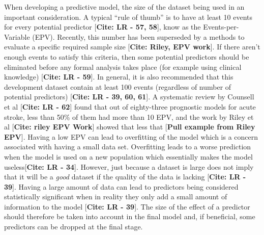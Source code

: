 \documentclass[12pt,PhD,twoside,openright]{muthesis}
\begin{document}
When developing a predictive model, the size of the dataset being used in an important consideration. A typical ``rule of thumb'' is to have at least 10 events for every potential predictor {[}\textbf{Cite: LR - 57, 58}{]}, know as the Events-per-Variable (EPV). Recently, this number has been superseded by a methods to evaluate a specific required sample size {[}\textbf{Cite: Riley, EPV work}{]}. If there aren't enough events to satisfy this criteria, then some potential predictors should be eliminated before any formal analysis takes place (for example using clinical knowledge) {[}\textbf{Cite: LR - 59}{]}. In general, it is also recommended that this development dataset contain at least 100 events (regardless of number of potential predictors) {[}\textbf{Cite: LR - 39, 60, 61}{]}. A systematic review by Counsell et al {[}\textbf{Cite: LR - 62}{]} found that out of eighty-three prognostic models for acute stroke, less than 50\% of them had more than 10 EPV, and the work by Riley et al {[}\textbf{Cite: riley EPV Work}{]} showed that less that {[}\textbf{Pull example from Riley EPV}{]}. Having a low EPV can lead to overfitting of the model which is a concern associated with having a small data set. Overfitting leads to a worse prediction when the model is used on a new population which essentially makes the model useless{[}\textbf{Cite: LR - 34}{]}. However, just because a dataset is large does not imply that it will be a \emph{good} dataset if the quality of the data is lacking {[}\textbf{Cite: LR - 39}{]}. Having a large amount of data can lead to predictors being considered statistically significant when in reality they only add a small amount of information to the model {[}\textbf{Cite: LR - 39}{]}. The size of the effect of a predictor should therefore be taken into account in the final model and, if beneficial, some predictors can be dropped at the final stage.
\end{document}

